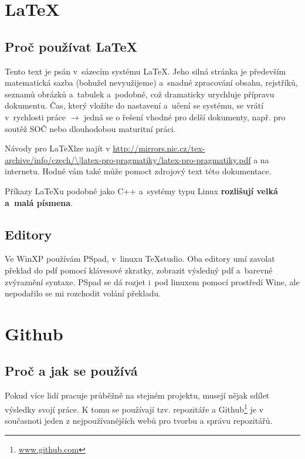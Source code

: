  
 
\section{\LaTeX} 

\subsection{Proč používat \LaTeX} 

Tento text je psán v~sázecím systému  \LaTeX . 
Jeho silná stránka je především matematická sazba 
(bohužel nevyužijeme) a~snadné zpracování obsahu, rejstříků, seznamů obrázků a~tabulek a~podobně, což dramaticky urychluje přípravu dokumentu. 
Čas, který vložíte do nastavení a~učení se systému, se vrátí v~rychlosti práce
 $\rightarrow$ jedná se o řešení vhodné pro delší dokumenty, např. pro soutěž SOČ nebo dlouhodobou maturitní práci. 
 
Návody pro \LaTeX lze najít v 
\url{http://mirrors.nic.cz/tex-archive/info/czech/\|latex-pro-pragmatiky/latex-pro-pragmatiky.pdf} %
\emergencystretch=2cm a na internetu.
Hodně vám také může pomoct zdrojový text této dokumentace. 

Příkazy \LaTeX{}u podobně jako C++ a~systémy typu Linux {\bf rozlišují velká a~malá písmena}. 
 

\subsection{Editory}

Ve WinXP používám PSpad, v~linuxu TeXstudio. 
Oba editory umí zavolat překlad do pdf pomocí klávesové zkratky, zobrazit výsledný pdf a~barevné zvýraznění syntaxe. 
PSpad se dá rozjet i~pod linuxem pomocí prostředí Wine, ale nepodařilo se mi rozchodit volání překladu. 


\section{Github}

\subsection{Proč a jak se používá}

Pokud více lidí pracuje průběžně na stejném projektu, musejí nějak sdílet výsledky svojí práce. K tomu se používají 
tzv. repozitáře a Github\footnote{\url{www.github.com}} je v současnoti jeden z nejpoužívanějších webů pro tvorbu a správu repozitářů. 


